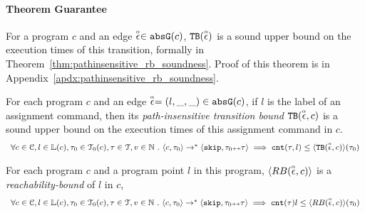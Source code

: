 \paragraph{Theorem Guarantee}
For a program $c$ and an edge $\stackrel{\scriptscriptstyle{\alpha}}{\mathtt{\epsilon}{}} \in \mathtt{abs}{\mathtt{G}}(c)$,
${\mathtt{TB}}(\stackrel{\scriptscriptstyle{\alpha}}{\mathtt{\epsilon}{}})$ is a sound upper bound
on the execution times of this transition,
formally in Theorem~\ref{thm:pathinsensitive_rb_soundness}. 
Proof of this theorem is in Appendix~\ref{apdx:pathinsensitive_rb_soundness}.
%
\begin{lem}
  \label{lem:edge_pathinsensitive_bound_soundness}
For each program ${c}$ and an edge $\stackrel{\scriptscriptstyle{\alpha}}{\mathtt{\epsilon}{}} = (l, \_, \_) \in \mathtt{abs}{\mathtt{G}}(c)$, if $l$ is the label of an assignment command,
then its \emph{path-insensitive transition bound} ${\mathtt{TB}}(\stackrel{\scriptscriptstyle{\alpha}}{\mathtt{\epsilon}{}}, c)$ 
 is a sound upper bound on 
the execution times of this assignment command in $c$.
  \[
    \begin{array}{l}
      \forall c \in \mathcal{C}, l \in \mathbb{L}(c),\mathtt{\tau}_0 \in \mathcal{T}_0(c), 
      \mathtt{\tau} \in \mathcal{T}, v \in \mathbb{N}
       ~.~ 
       \langle {c}, \mathtt{\tau}_0 \rangle \to^{*} \langle \mathtt{skip}, \mathtt{\tau}_0{\scriptscriptstyle ++}\mathtt{\tau} \rangle 
      \implies
      \mathtt{cnt}(\mathtt{\tau}, l) \leq \langle {\ensuremath{\mathtt{TB}}}(\stackrel{\scriptscriptstyle{\alpha}}{\mathtt{\epsilon}{}}, c) \rangle(\mathtt{\tau}_0)
    \end{array}
    \]
\end{lem}
%
\begin{thm}
  \label{thm:pathinsensitive_rb_soundness}
For each program ${c}$ and a program point $l$ in this program,
$\langle RB(\stackrel{\scriptscriptstyle{\alpha}}{\mathtt{\epsilon}{}}, c) \rangle$
 is a \emph{reachability-bound} of $l$ in $c$,
  \[
    \begin{array}{l}
      \forall c \in \mathcal{C}, l \in \mathbb{L}(c),\mathtt{\tau}_0 \in \mathcal{T}_0(c), 
      \mathtt{\tau} \in \mathcal{T}, v \in \mathbb{N}
       ~.~ 
      \langle {c}, \mathtt{\tau}_0 \rangle \to^{*} \langle \mathtt{skip}, \mathtt{\tau}_0{\scriptscriptstyle ++}\mathtt{\tau} \rangle 
      \implies
      \mathtt{cnt}(\mathtt{\tau})l
      \leq \langle RB(\stackrel{\scriptscriptstyle{\alpha}}{\mathtt{\epsilon}{}}, c) \rangle(\mathtt{\tau}_0)
    \end{array}
    \]
\end{thm}

